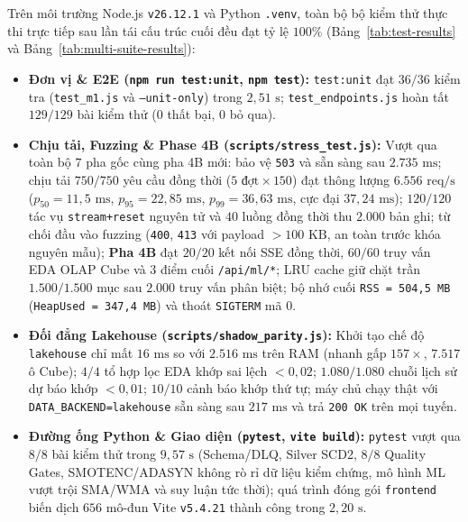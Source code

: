 Trên môi trường Node.js \texttt{v26.12.1} và Python \texttt{.venv}, toàn bộ bộ kiểm thử thực thi trực tiếp sau lần tái cấu trúc cuối đều đạt tỷ lệ $100\%$ (Bảng~\ref{tab:test-results} và Bảng~\ref{tab:multi-suite-results}):
\begin{itemize}[topsep=0pt, itemsep=1pt]
	\item \textbf{Đơn vị \& E2E (\texttt{npm run test:unit}, \texttt{npm test}):} \texttt{test:unit} đạt \textbf{$36/36$} kiểm tra (\texttt{test_m1.js} và \texttt{--unit-only}) trong $2{,}51\text{ s}$; \texttt{test_endpoints.js} hoàn tất \textbf{$129/129$} bài kiểm thử ($0$ thất bại, $0$ bỏ qua).
	\item \textbf{Chịu tải, Fuzzing \& Phase 4B (\texttt{scripts/stress_test.js}):} Vượt qua toàn bộ $7$ pha gốc cùng pha 4B mới: bảo vệ \texttt{503} và sẵn sàng sau $2.735\text{ ms}$; chịu tải \textbf{$750/750$} yêu cầu đồng thời ($5 \text{ đợt} \times 150$) đạt thông lượng \textbf{$6.556\text{ req/s}$} ($p_{50}=11{,}5\text{ ms}$, $p_{95}=22{,}85\text{ ms}$, $p_{99}=36{,}63\text{ ms}$, cực đại $37{,}24\text{ ms}$); $120/120$ tác vụ \texttt{stream+reset} nguyên tử và $40$ luồng đồng thời thu $2.000$ bản ghi; từ chối đầu vào fuzzing (\texttt{400}, \texttt{413} với payload $>100\text{ KB}$, an toàn trước khóa nguyên mẫu); \textbf{Pha 4B} đạt $20/20$ kết nối SSE đồng thời, $60/60$ truy vấn EDA OLAP Cube và $3$ điểm cuối \texttt{/api/ml/*}; LRU cache giữ chặt trần $1.500/1.500$ mục sau $2.000$ truy vấn phân biệt; bộ nhớ cuối \texttt{RSS = 504,5 MB} (\texttt{HeapUsed = 347,4 MB}) và thoát \texttt{SIGTERM} mã $0$.
	\item \textbf{Đối đẳng Lakehouse (\texttt{scripts/shadow_parity.js}):} Khởi tạo chế độ \texttt{lakehouse} chỉ mất \textbf{$16\text{ ms}$} so với $2.516\text{ ms}$ trên RAM (nhanh gấp \textbf{$157\times$}, $7.517$ ô Cube); $4/4$ tổ hợp lọc EDA khớp sai lệch $<0{,}02$; $1.080/1.080$ chuỗi lịch sử dự báo khớp $<0{,}01$; $10/10$ cảnh báo khớp thứ tự; máy chủ chạy thật với \texttt{DATA_BACKEND=lakehouse} sẵn sàng sau $217\text{ ms}$ và trả \texttt{200 OK} trên mọi tuyến.
	\item \textbf{Đường ống Python \& Giao diện (\texttt{pytest}, \texttt{vite build}):} \texttt{pytest} vượt qua \textbf{$8/8$} bài kiểm thử trong $9{,}57\text{ s}$ (Schema/DLQ, Silver SCD2, $8/8$ Quality Gates, SMOTENC/ADASYN không rò rỉ dữ liệu kiểm chứng, mô hình ML vượt trội SMA/WMA và suy luận tức thời); quá trình đóng gói \texttt{frontend} biến dịch $656$ mô-đun Vite \texttt{v5.4.21} thành công trong $2{,}20\text{ s}$.
\end{itemize}

